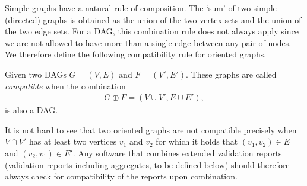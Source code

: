 Simple graphs have a natural rule of composition. The `sum' of two simple
(directed) graphs is obtained as the union of the two vertex sets and the union
of the two edge sets. For a DAG, this combination rule does not always apply
since we are not allowed to have more than a single edge between any pair of
nodes.  We therefore define the following compatibility rule for oriented
graphs.
\begin{definition}
\label{def:compatibledag}
Given two DAGs $G=(V,E)$ and $F=(V',E')$. These graphs are called
\emph{compatible} when the combination
\begin{align*}
G\oplus F = (V\cup V', E\cup E'),
\end{align*}
is also a DAG.
\end{definition}
It is not hard to see that two oriented graphs are not compatible precisely
when $V\cap V'$ has at least two vertices $v_1$ and $v_2$ for which it holds
that $(v_1,v_2)\in E$ and $(v_2,v_1)\in E'$. Any software that combines
extended validation reports (validation reports including aggregates, to be
defined below) should therefore always check for compatibility of the reports
upon combination.


